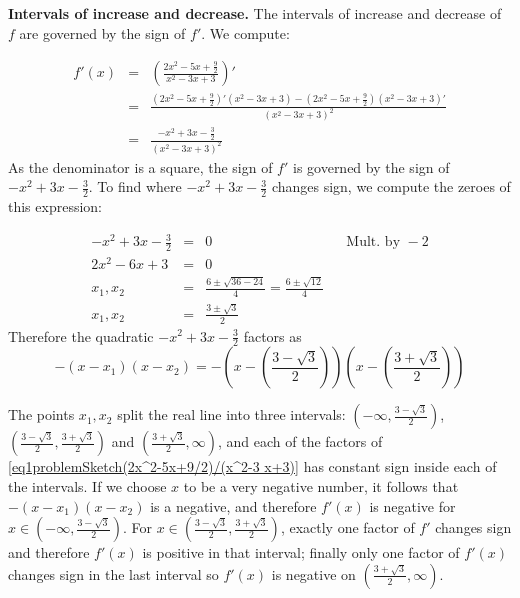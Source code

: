 {\textbf{Intervals of increase and decrease.}
The intervals of increase and decrease of $f$ are governed by the sign of $f'$. We compute:

\[
\begin{array}{rcl}
f'(x)&=&\displaystyle \left(\frac{2x^2-5x+\frac{9}{2} }{x^2- 3 x+3} \right)' \\
&=&\displaystyle \frac{\left(2x^2-5x+\frac{9}{2}\right)'\left(x^2- 3 x+3\right)-\left(2x^2-5x+\frac{9}{2}\right)\left(x^2- 3 x+3\right)' }{ \left(x^2- 3 x+3\right)^2}\\
&=&\displaystyle \frac{- x^{2}+3 x-\frac{3}{2} }{ \left(x^2- 3 x+3\right)^2}
\end{array}
\]
As the denominator is a square, the sign of $f'$ is governed by the sign of $- x^{2}+3 x-\frac{3}{2}$. To find where $- x^{2}+3 x-\frac{3}{2}$ changes sign, we compute the zeroes of this expression:

\[
\begin{array}{rcll|l}
\displaystyle - x^{2}+3 x-\frac{3}{2}&=&0&& \text{Mult. by }-2\\
\displaystyle  2x^{2}-6 x+3&=&0\\
x_1, x_2&=&\displaystyle \frac{ 6\pm \sqrt{36-24 }}{4}=\frac{6\pm \sqrt{12}}{4}\\
x_1, x_2&=&\displaystyle \frac{3\pm \sqrt{3}}{2} 
\end{array}
\]
Therefore the quadratic $- x^{2}+3 x-\frac{3}{2}$ factors as 
\begin{equation}
\label{eq1problemSketch(2x^2-5x+9/2)/(x^2-3 x+3)}
-(x-x_1)(x-x_2)=-\left(x-\left(\frac{3- \sqrt{3}}{2} \right)\right)\left(x-\left(\frac{3+ \sqrt{3}}{2}\right)\right)
\end{equation} 

The points $x_1, x_2$ split the real line into three intervals: $(-\infty, \frac{3- \sqrt{3}}{2})$, $(\frac{3- \sqrt{3}}{2}, \frac{3+ \sqrt{3}}{2} )$ and $(\frac{3+ \sqrt{3}}{2}, \infty )$, and each of the factors of \eqref{eq1problemSketch(2x^2-5x+9/2)/(x^2-3 x+3)} has constant sign inside each of the intervals. If we choose $x$ to be a very negative number, it follows that $-(x-x_1)(x-x_2)$ is a negative, and therefore $ f'(x)$ is negative for $x\in(-\infty, \frac{3- \sqrt{3}}{2})$. For $x\in (\frac{3- \sqrt{3}}{2}, \frac{3+ \sqrt{3}}{2})$, exactly one factor of $f'$ changes sign and therefore $f'(x)$ is positive in that interval; finally only one factor of $f'(x)$ changes sign in the last interval so $f'(x)$ is negative on $(\frac{3+ \sqrt{3}}{2}, \infty )$.

}
